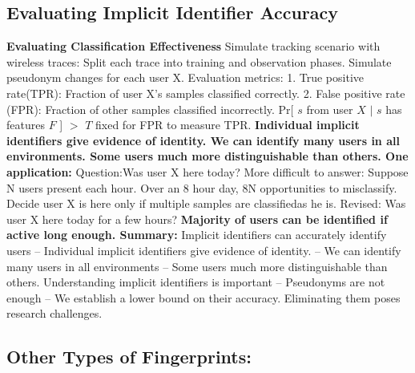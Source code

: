 \documentclass[9pt]{extarticle}
\begin{document}
\begin{multicols}{2}
\subsection{Evaluating Implicit Identifier Accuracy}
\textbf{Evaluating Classification Effectiveness} Simulate tracking scenario with wireless traces: Split each trace into training and observation phases. Simulate pseudonym changes for each user X. Evaluation metrics: 1. True positive rate(TPR): Fraction of user X’s samples classified correctly. 2. False positive rate (FPR): Fraction of other samples classified incorrectly. Pr[ $s$ from user $X$ $|$ $s$ has features $F$ ] $>$ $T$ fixed for FPR to measure TPR. \textbf{Individual implicit identifiers give evidence of identity. We can identify many users in all environments. Some users much more distinguishable than others. One application: }Question:Was user X here today? More difficult to answer: Suppose N users present each hour. Over an 8 hour day, 8N opportunities to misclassify. Decide user X is here only if multiple samples are classifiedas he is. Revised: Was user X here today for a few hours? \textbf{Majority of users can be identified if active long enough. Summary:} Implicit identifiers can accurately identify users – Individual implicit identifiers give evidence of identity. – We can identify many users in all environments – Some users much more distinguishable than others. Understanding implicit identifiers is important – Pseudonyms are not enough – We establish a lower bound on their accuracy. Eliminating them poses research challenges. 

\subsection{\textbf{Other Types of Fingerprints:}} 


\end{multicols}
\end{document}
